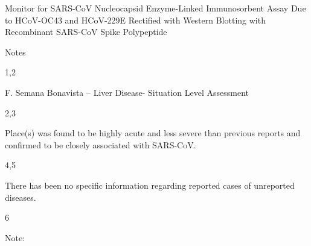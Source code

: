 \documentclass{article}
\begin{document}
Monitor for SARS-CoV Nucleocapsid Enzyme-Linked Immunosorbent Assay Due to HCoV-OC43 and HCoV-229E Rectified with Western Blotting with Recombinant SARS-CoV Spike Polypeptide

Notes

1,2

F. Semana Bonavista – Liver Disease- Situation Level Assessment

2,3

Place(s) was found to be highly acute and less severe than previous reports and confirmed to be closely associated with SARS-CoV.

4,5

There has been no specific information regarding reported cases of unreported diseases.

6

Note:
\end{document}
